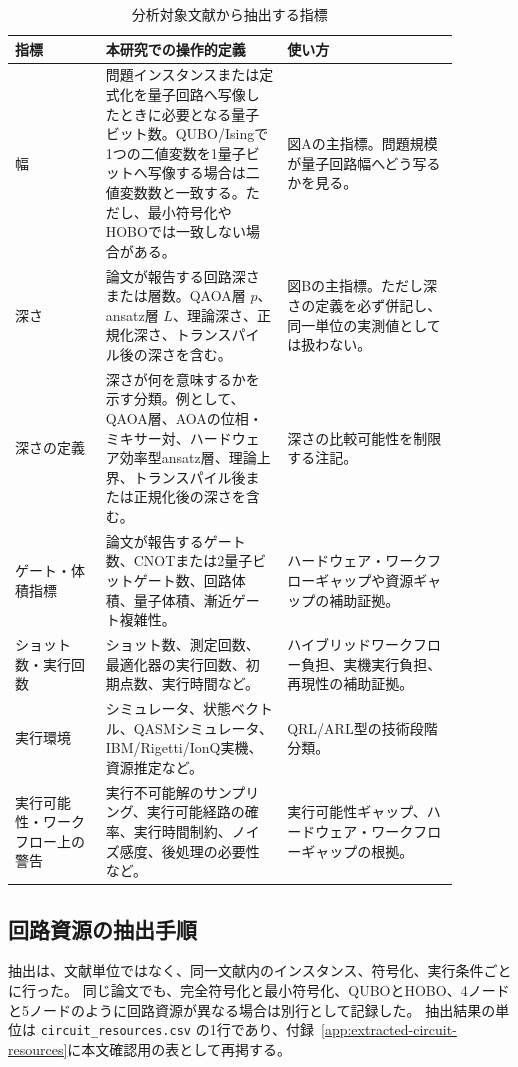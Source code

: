 \begin{table}[t]
\centering
\caption{分析対象文献から抽出する指標}
\label{tab:indicators}
\small
\begin{tabular}{p{0.18\linewidth}p{0.36\linewidth}p{0.34\linewidth}}
\toprule
指標 & 本研究での操作的定義 & 使い方 \\
\midrule
幅 & 問題インスタンスまたは定式化を量子回路へ写像したときに必要となる量子ビット数。QUBO/Isingで1つの二値変数を1量子ビットへ写像する場合は二値変数数と一致する。ただし、最小符号化やHOBOでは一致しない場合がある。 & 図Aの主指標。問題規模が量子回路幅へどう写るかを見る。 \\
深さ & 論文が報告する回路深さまたは層数。QAOA層 $p$、ansatz層 $L$、理論深さ、正規化深さ、トランスパイル後の深さを含む。 & 図Bの主指標。ただし深さの定義を必ず併記し、同一単位の実測値としては扱わない。 \\
深さの定義 & 深さが何を意味するかを示す分類。例として、QAOA層、AOAの位相・ミキサー対、ハードウェア効率型ansatz層、理論上界、トランスパイル後または正規化後の深さを含む。 & 深さの比較可能性を制限する注記。 \\
ゲート・体積指標 & 論文が報告するゲート数、CNOTまたは2量子ビットゲート数、回路体積、量子体積、漸近ゲート複雑性。 & ハードウェア・ワークフローギャップや資源ギャップの補助証拠。 \\
ショット数・実行回数 & ショット数、測定回数、最適化器の実行回数、初期点数、実行時間など。 & ハイブリッドワークフロー負担、実機実行負担、再現性の補助証拠。 \\
実行環境 & シミュレータ、状態ベクトル、QASMシミュレータ、IBM/Rigetti/IonQ実機、資源推定など。 & QRL/ARL型の技術段階分類。 \\
実行可能性・ワークフロー上の警告 & 実行不可能解のサンプリング、実行可能経路の確率、実行時間制約、ノイズ感度、後処理の必要性など。 & 実行可能性ギャップ、ハードウェア・ワークフローギャップの根拠。 \\
\bottomrule
\end{tabular}
\normalsize
\end{table}

\subsection{回路資源の抽出手順}

抽出は、文献単位ではなく、同一文献内のインスタンス、符号化、実行条件ごとに行った。
同じ論文でも、完全符号化と最小符号化、QUBOとHOBO、4ノードと5ノードのように回路資源が異なる場合は別行として記録した。
抽出結果の単位は \texttt{circuit\_resources.csv} の1行であり、付録~\ref{app:extracted-circuit-resources}に本文確認用の表として再掲する。

